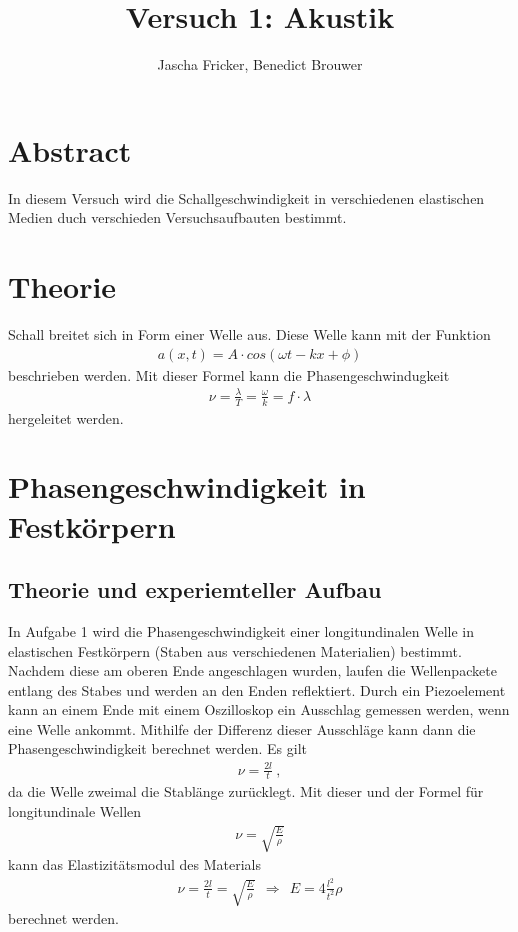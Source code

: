 \documentclass[11pt, a4paper]{article}
\title{Versuch 1: Akustik}
\author{Jascha Fricker, Benedict Brouwer}
\begin{document}
    \maketitle

    \section{Abstract}
    In diesem Versuch wird die Schallgeschwindigkeit in verschiedenen elastischen Medien
    duch verschieden Versuchsaufbauten bestimmt.

    \tableofcontents

    \newpage
    
    \section{Theorie}
    Schall breitet sich in Form einer Welle aus. Diese Welle kann mit der Funktion
    \begin{align}
        a(x, t) = A \cdot cos(\omega t-kx+\phi )
    \end{align}
    beschrieben werden. Mit dieser Formel kann die Phasengeschwindugkeit
    \begin{align}
        \nu = \frac{\lambda}{T} = \frac{\omega}{k} = f \cdot \lambda
    \end{align}
    hergeleitet werden. \\
    \section{Phasengeschwindigkeit in Festkörpern}

    \subsection{Theorie und experiemteller Aufbau}
    In Aufgabe 1 wird die Phasengeschwindigkeit einer longitundinalen Welle in elastischen Festkörpern (Staben aus verschiedenen Materialien) bestimmt.
    Nachdem diese am oberen Ende angeschlagen wurden, laufen die Wellenpackete entlang des Stabes und werden an den Enden reflektiert.
    Durch ein Piezoelement kann an einem Ende mit einem Oszilloskop ein Ausschlag gemessen werden, wenn eine Welle ankommt.
    Mithilfe der Differenz dieser Ausschläge kann dann die Phasengeschwindigkeit berechnet werden. Es gilt
    \begin{align}
        \nu = \frac{2l}{t} \ ,
    \end{align}
    da die Welle zweimal die Stablänge zurücklegt. Mit dieser und der Formel für longitundinale Wellen
    \begin{align}
        \nu = \sqrt{\frac{E}{\rho}}
    \end{align}
    kann das Elastizitätsmodul des Materials
    \begin{align}
        \nu = \frac{2l}{t} = \sqrt{\frac{E}{\rho}} \ \ \Rightarrow \ \ E = 4\frac{l^2}{t^2} \rho
    \end{align}
    berechnet werden.
\end{document}
